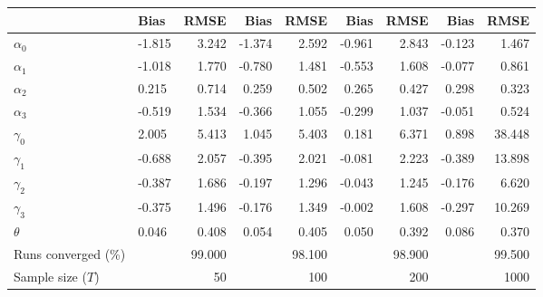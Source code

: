 
\begin{tabular}[t]{llrrrrrrr}
\toprule
  & Bias & RMSE & Bias & RMSE & Bias & RMSE & Bias & RMSE\\
\midrule
$\alpha_{0}$ & -1.815 & 3.242 & -1.374 & 2.592 & -0.961 & 2.843 & -0.123 & 1.467\\
$\alpha_{1}$ & -1.018 & 1.770 & -0.780 & 1.481 & -0.553 & 1.608 & -0.077 & 0.861\\
$\alpha_{2}$ & 0.215 & 0.714 & 0.259 & 0.502 & 0.265 & 0.427 & 0.298 & 0.323\\
$\alpha_{3}$ & -0.519 & 1.534 & -0.366 & 1.055 & -0.299 & 1.037 & -0.051 & 0.524\\
$\gamma_{0}$ & 2.005 & 5.413 & 1.045 & 5.403 & 0.181 & 6.371 & 0.898 & 38.448\\
$\gamma_{1}$ & -0.688 & 2.057 & -0.395 & 2.021 & -0.081 & 2.223 & -0.389 & 13.898\\
$\gamma_{2}$ & -0.387 & 1.686 & -0.197 & 1.296 & -0.043 & 1.245 & -0.176 & 6.620\\
$\gamma_{3}$ & -0.375 & 1.496 & -0.176 & 1.349 & -0.002 & 1.608 & -0.297 & 10.269\\
$\theta$ & 0.046 & 0.408 & 0.054 & 0.405 & 0.050 & 0.392 & 0.086 & 0.370\\
Runs converged (\%) &  & 99.000 &  & 98.100 &  & 98.900 &  & 99.500\\
Sample size ($T$) &  & 50 &  & 100 &  & 200 &  & 1000\\
\bottomrule
\end{tabular}
